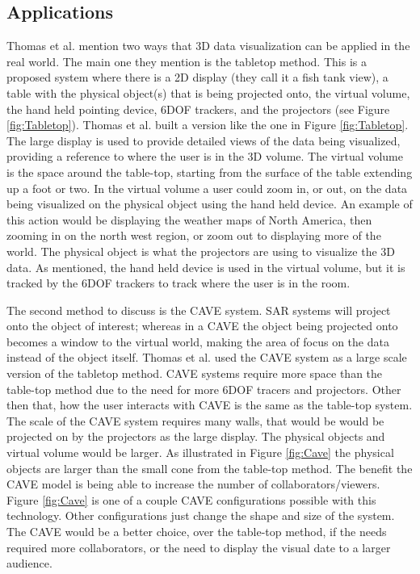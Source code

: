 \documentclass{sig-alternate}
\begin{document}
\subsection{Applications}
\label{sec:3D Applications}
Thomas et al. \cite{3D} mention two ways that 3D data visualization can be applied in the real world. The main one they mention is the tabletop method. This is a proposed system where there is a 2D display (they call it a fish tank view), a table with the physical object(s) that is being projected onto, the virtual volume, the hand held pointing device, 6DOF trackers, and the projectors (see Figure \ref{fig:Tabletop}). Thomas et al. \cite{3D} built a version like the one in Figure \ref{fig:Tabletop}. The large display is used to provide detailed views of the data being visualized, providing a reference to where the user is in the 3D volume. The virtual volume is the space around the table-top, starting from the surface of the table extending up a foot or two. In the virtual volume a user could zoom in, or out, on the data being visualized on the physical object using the hand held device. An example of this action would be displaying the weather maps of North America, then zooming in on the north west region, or zoom out to displaying more of the world. The physical object is what the projectors are using to visualize the 3D data. As mentioned, the hand held device is used in the virtual volume, but it is tracked by the 6DOF trackers to track where the user is in the room.

The second method to discuss is the CAVE system. SAR systems will project onto the object of interest; whereas in a CAVE the object being projected onto becomes a window to the virtual world, making the area of focus on the data instead of the object itself. Thomas et al. \cite{3D} used the CAVE system as a large scale version of the tabletop method. CAVE systems require more space than the table-top method due to the need for more 6DOF tracers and projectors. Other then that, how the user interacts with CAVE is the same as the table-top system. The scale of the CAVE system requires many walls, that would be would be projected on by the projectors as the large display. The physical objects and virtual volume would be larger. As illustrated in Figure \ref{fig:Cave} the physical objects are larger than the small cone from the table-top method. The benefit the CAVE model is being able to increase the number of collaborators/viewers. Figure \ref{fig:Cave} is one of a couple CAVE configurations possible with this technology. Other configurations just change the shape and size of the system. The CAVE would be a better choice, over the table-top method, if the needs required more collaborators, or the need to display the visual date to a larger audience. 
\end{document}
